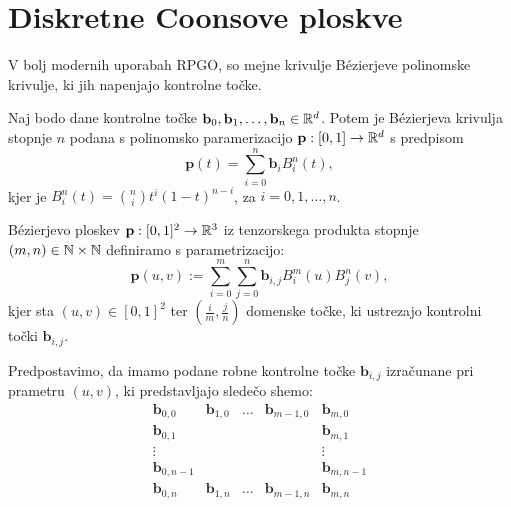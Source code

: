 \documentclass[a4paper,12pt]{article}
\begin{document}
\section{Diskretne Coonsove ploskve}
V bolj modernih uporabah RPGO, so mejne krivulje Bézierjeve polinomske krivulje, 
ki jih napenjajo kontrolne točke. 
\begin{definicija}
    Naj bodo dane kontrolne točke $\mathbf{b}_0, \mathbf{b}_1, \dots, \mathbf{b}_n \in \mathbb{R}^d$. 
    Potem je Bézierjeva krivulja stopnje $n$ podana s polinomsko paramerizacijo $\mathbf{p}: [0,1] \rightarrow \mathbb{R}^d$ s predpisom 
    $$\mathbf{p}(t) = \sum_{i=0}^n \mathbf{b}_{i} B_i^n(t),$$
    kjer je $B_i^n(t) = \binom{n}{i} t^i (1-t)^{n-i}$, za $i = 0, 1,\dots,n$. 
\end{definicija}



\begin{definicija}
    Bézierjevo ploskev $\mathbf{p} : [0,1]^2 \rightarrow \mathbb{R}^3$ iz tenzorskega produkta stopnje 
    $(m, n) \in \mathbb{N} \times \mathbb{N}$ definiramo s parametrizacijo:
    $$\mathbf{p}(u,v) := \sum_{i=0}^m \sum_{j=0}^n \mathbf{b}_{i,j} B_i^m(u)B_j^n(v),$$
    kjer sta $(u,v) \in [0,1]^2$ ter $(\frac{i}{m}, \frac{j}{n})$
    domenske točke, ki ustrezajo kontrolni točki $\mathbf{b}_{i,j}$.
\end{definicija}


Predpostavimo, da imamo podane robne kontrolne točke $\mathbf{b}_{i,j}$ 
izračunane pri prametru $(u,v)$, ki predstavljajo sledečo shemo: 
$$
\begin{matrix}
   \mathbf{b}_{0,0}  &\mathbf{b}_{1,0} & \ldots &\mathbf{b}_{m-1,0} &\mathbf{b}_{m,0} \\
   \mathbf{b}_{0,1}  &                 &        &                   &\mathbf{b}_{m,1} \\
   \vdots            &                 &        &                   &  \vdots\\
   \mathbf{b}_{0,n-1} &                &        &                    &\mathbf{b}_{m,n-1} \\ 
   \mathbf{b}_{0,n}  &\mathbf{b}_{1,n} & \ldots &\mathbf{b}_{m-1,n} &\mathbf{b}_{m,n} 
\end{matrix}
$$

   
\end{document}
